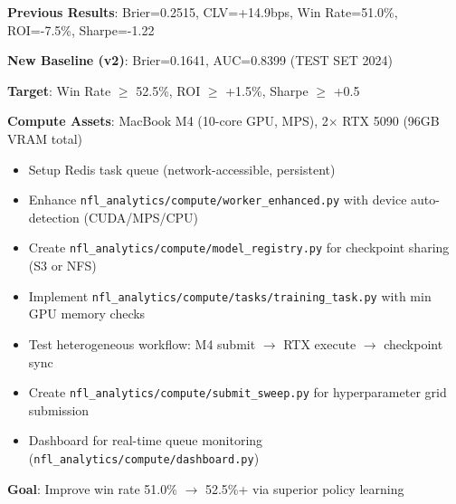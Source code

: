\textbf{Previous Results}: Brier=0.2515, CLV=+14.9bps, Win Rate=51.0\%, ROI=-7.5\%, Sharpe=-1.22

\textbf{New Baseline (v2)}: Brier=0.1641, AUC=0.8399 (TEST SET 2024)

\textbf{Target}: Win Rate $\ge$ 52.5\%, ROI $\ge$ +1.5\%, Sharpe $\ge$ +0.5

\textbf{Compute Assets}: MacBook M4 (10-core GPU, MPS), 2$\times$ RTX 5090 (96GB VRAM total)

\begin{itemize}
  \item {} Setup Redis task queue (network-accessible, persistent)
  \item {} Enhance \texttt{nfl\_analytics/compute/worker\_enhanced.py} with device auto-detection (CUDA/MPS/CPU)
  \item {} Create \texttt{nfl\_analytics/compute/model\_registry.py} for checkpoint sharing (S3 or NFS)
  \item {} Implement \texttt{nfl\_analytics/compute/tasks/training\_task.py} with min GPU memory checks
  \item {} Test heterogeneous workflow: M4 submit $\to$ RTX execute $\to$ checkpoint sync
  \item {} Create \texttt{nfl\_analytics/compute/submit\_sweep.py} for hyperparameter grid submission
  \item {} Dashboard for real-time queue monitoring (\texttt{nfl\_analytics/compute/dashboard.py})
\end{itemize}

\textbf{Goal}: Improve win rate 51.0\% $\to$ 52.5\%+ via superior policy learning

